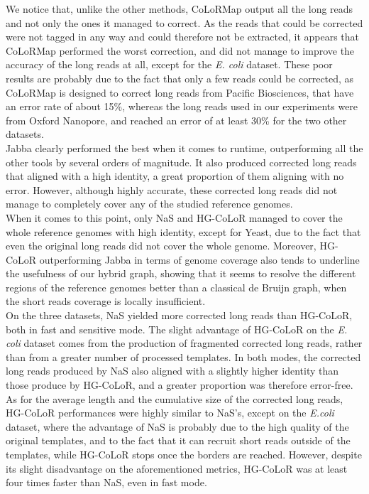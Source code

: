 \documentclass[long, final]{jobim2017}
\begin{document}
We notice that, unlike the other methods, CoLoRMap output all the long reads and not only the ones it managed to correct. As the reads that could be corrected were not tagged in any way and could therefore not be extracted, it appears that CoLoRMap performed the worst correction, and did not manage to improve the accuracy of the long reads at all, except for the \emph{E. coli} dataset. These poor results are probably due to the fact that only a few reads could be corrected, as CoLoRMap is designed to correct long reads from Pacific Biosciences, that have an error rate of about 15\%, whereas the long reads used in our experiments were from Oxford Nanopore, and reached an error of at least 30\% for the two other datasets. \\
\indent Jabba clearly performed the best when it comes to runtime, outperforming all the other tools by several orders of magnitude. It also produced corrected long reads that aligned with a high identity, a great proportion of them aligning with no error. However, although highly accurate, these corrected long reads did not manage to completely cover any of the studied reference genomes. \\
\indent When it comes to this point, only NaS and HG-CoLoR managed to cover the whole reference genomes with high identity, except for Yeast, due to the fact that even the original long reads did not cover the whole genome. Moreover, HG-CoLoR outperforming Jabba in terms of genome coverage also tends to underline the usefulness of our hybrid graph, showing that it seems to resolve the different regions of the reference genomes better than a classical de Bruijn graph, when the short reads coverage is locally insufficient. \\
\indent On the three datasets, NaS yielded more corrected long reads than HG-CoLoR, both in fast and sensitive mode. The slight advantage of HG-CoLoR on the \emph{E. coli} dataset comes from the production of fragmented corrected long reads, rather than from a greater number of processed templates. In both modes, the corrected long reads produced by NaS also aligned with a slightly higher identity than those produce by HG-CoLoR, and a greater proportion was therefore error-free. As for the average length and the cumulative size of the corrected long reads, HG-CoLoR performances were highly similar to NaS's, except on the \emph{E.coli} dataset, where the advantage of NaS is probably due to the high quality of the original templates, and to the fact that it can recruit short reads outside of the templates, while HG-CoLoR stops once the borders are reached. However, despite its slight disadvantage on the aforementioned metrics, HG-CoLoR was at least four times faster than NaS, even in fast mode.
\end{document}
